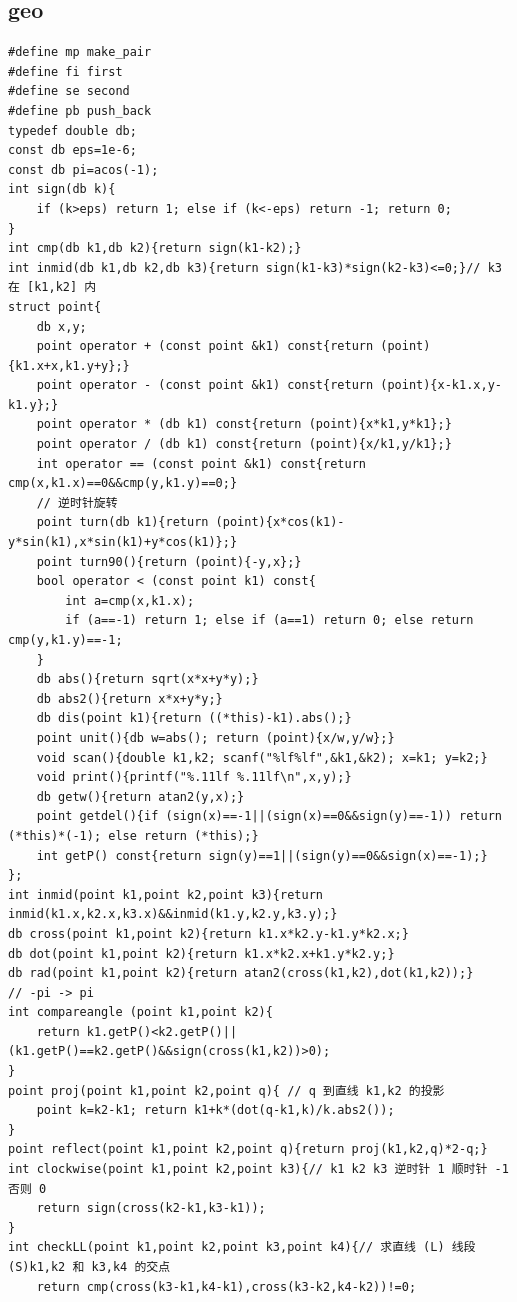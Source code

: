 \documentclass[twoside]{article}
\begin{document}
\subsection{geo}
\begin{lstlisting}
#define mp make_pair
#define fi first
#define se second
#define pb push_back
typedef double db;
const db eps=1e-6;
const db pi=acos(-1);
int sign(db k){
    if (k>eps) return 1; else if (k<-eps) return -1; return 0;
}
int cmp(db k1,db k2){return sign(k1-k2);}
int inmid(db k1,db k2,db k3){return sign(k1-k3)*sign(k2-k3)<=0;}// k3 在 [k1,k2] 内 
struct point{
    db x,y;
    point operator + (const point &k1) const{return (point){k1.x+x,k1.y+y};}
    point operator - (const point &k1) const{return (point){x-k1.x,y-k1.y};}
    point operator * (db k1) const{return (point){x*k1,y*k1};}
    point operator / (db k1) const{return (point){x/k1,y/k1};}
    int operator == (const point &k1) const{return cmp(x,k1.x)==0&&cmp(y,k1.y)==0;}
    // 逆时针旋转 
    point turn(db k1){return (point){x*cos(k1)-y*sin(k1),x*sin(k1)+y*cos(k1)};}
    point turn90(){return (point){-y,x};}
    bool operator < (const point k1) const{
        int a=cmp(x,k1.x);
        if (a==-1) return 1; else if (a==1) return 0; else return cmp(y,k1.y)==-1;
    }
    db abs(){return sqrt(x*x+y*y);}
    db abs2(){return x*x+y*y;}
    db dis(point k1){return ((*this)-k1).abs();}
    point unit(){db w=abs(); return (point){x/w,y/w};}
    void scan(){double k1,k2; scanf("%lf%lf",&k1,&k2); x=k1; y=k2;}
    void print(){printf("%.11lf %.11lf\n",x,y);}
    db getw(){return atan2(y,x);} 
    point getdel(){if (sign(x)==-1||(sign(x)==0&&sign(y)==-1)) return (*this)*(-1); else return (*this);}
	int getP() const{return sign(y)==1||(sign(y)==0&&sign(x)==-1);}
};
int inmid(point k1,point k2,point k3){return inmid(k1.x,k2.x,k3.x)&&inmid(k1.y,k2.y,k3.y);}
db cross(point k1,point k2){return k1.x*k2.y-k1.y*k2.x;}
db dot(point k1,point k2){return k1.x*k2.x+k1.y*k2.y;}
db rad(point k1,point k2){return atan2(cross(k1,k2),dot(k1,k2));}
// -pi -> pi
int compareangle (point k1,point k2){
    return k1.getP()<k2.getP()||(k1.getP()==k2.getP()&&sign(cross(k1,k2))>0);
}
point proj(point k1,point k2,point q){ // q 到直线 k1,k2 的投影 
    point k=k2-k1; return k1+k*(dot(q-k1,k)/k.abs2());
}
point reflect(point k1,point k2,point q){return proj(k1,k2,q)*2-q;}
int clockwise(point k1,point k2,point k3){// k1 k2 k3 逆时针 1 顺时针 -1 否则 0  
    return sign(cross(k2-k1,k3-k1));
}
int checkLL(point k1,point k2,point k3,point k4){// 求直线 (L) 线段 (S)k1,k2 和 k3,k4 的交点 
    return cmp(cross(k3-k1,k4-k1),cross(k3-k2,k4-k2))!=0;

\end{lstlisting}
\end{document}
